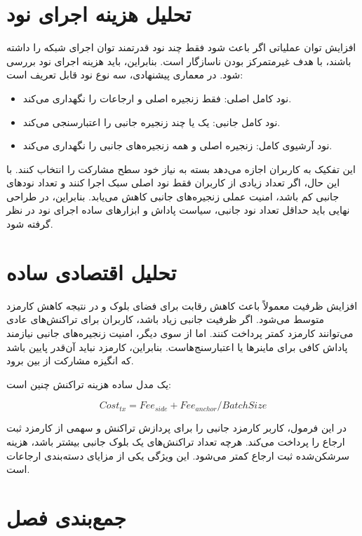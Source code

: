 \section{تحلیل هزینه اجرای نود}

افزایش توان عملیاتی اگر باعث شود فقط چند نود قدرتمند توان اجرای شبکه را داشته باشند، با هدف غیرمتمرکز بودن ناسازگار است. بنابراین، باید هزینه اجرای نود بررسی شود. در معماری پیشنهادی، سه نوع نود قابل تعریف است:

\begin{itemize}
\item نود کامل اصلی: فقط زنجیره اصلی و ارجاعات را نگهداری می‌کند.
\item نود کامل جانبی: یک یا چند زنجیره جانبی را اعتبارسنجی می‌کند.
\item نود آرشیوی کامل: زنجیره اصلی و همه زنجیره‌های جانبی را نگهداری می‌کند.
\end{itemize}

این تفکیک به کاربران اجازه می‌دهد بسته به نیاز خود سطح مشارکت را انتخاب کنند. با این حال، اگر تعداد زیادی از کاربران فقط نود اصلی سبک اجرا کنند و تعداد نودهای جانبی کم باشد، امنیت عملی زنجیره‌های جانبی کاهش می‌یابد. بنابراین، در طراحی نهایی باید حداقل تعداد نود جانبی، سیاست پاداش و ابزارهای ساده اجرای نود در نظر گرفته شود.

\section{تحلیل اقتصادی ساده}

افزایش ظرفیت معمولاً باعث کاهش رقابت برای فضای بلوک و در نتیجه کاهش کارمزد متوسط می‌شود. اگر ظرفیت جانبی زیاد باشد، کاربران برای تراکنش‌های عادی می‌توانند کارمزد کمتر پرداخت کنند. اما از سوی دیگر، امنیت زنجیره‌های جانبی نیازمند پاداش کافی برای ماینرها یا اعتبارسنج‌هاست. بنابراین، کارمزد نباید آن‌قدر پایین باشد که انگیزه مشارکت از بین برود.

یک مدل ساده هزینه تراکنش چنین است:

\begin{latin}
\[
Cost_{tx} = Fee_{side} + Fee_{anchor}/BatchSize
\]
\end{latin}

در این فرمول، کاربر کارمزد جانبی را برای پردازش تراکنش و سهمی از کارمزد ثبت ارجاع را پرداخت می‌کند. هرچه تعداد تراکنش‌های یک بلوک جانبی بیشتر باشد، هزینه سرشکن‌شده ثبت ارجاع کمتر می‌شود. این ویژگی یکی از مزایای دسته‌بندی ارجاعات است.

\section{جمع‌بندی فصل}

